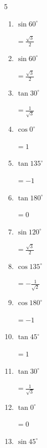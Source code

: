 \begin{multicols}{5}
\begin{enumerate}
        $\displaystyle =1$

  \item $\displaystyle \sin{60^\circ}$

        $\displaystyle =\frac{\sqrt{3}}{2}$

  \item $\displaystyle \sin{60^\circ}$

        $\displaystyle =\frac{\sqrt{3}}{2}$

  \item $\displaystyle \tan{30^\circ}$

        $\displaystyle =\frac{1}{\sqrt{3}}$

\columnbreak %

\resetques

  \item $\displaystyle \cos{0^\circ}$

        $\displaystyle =1$

  \item $\displaystyle \tan{135^\circ}$

        $\displaystyle =-1$

  \item $\displaystyle \tan{180^\circ}$

        $\displaystyle =0$

  \item $\displaystyle \sin{120^\circ}$

        $\displaystyle =\frac{\sqrt{3}}{2}$

  \item $\displaystyle \cos{135^\circ}$

        $\displaystyle =-\frac{1}{\sqrt{2}}$

  \item $\displaystyle \cos{180^\circ}$

        $\displaystyle =-1$

  \item $\displaystyle \tan{45^\circ}$

        $\displaystyle =1$

  \item $\displaystyle \tan{30^\circ}$

        $\displaystyle =\frac{1}{\sqrt{3}}$

  \item $\displaystyle \tan{0^\circ}$

        $\displaystyle =0$

  \item $\displaystyle \sin{45^\circ}$


\end{enumerate}
\end{multicols}
